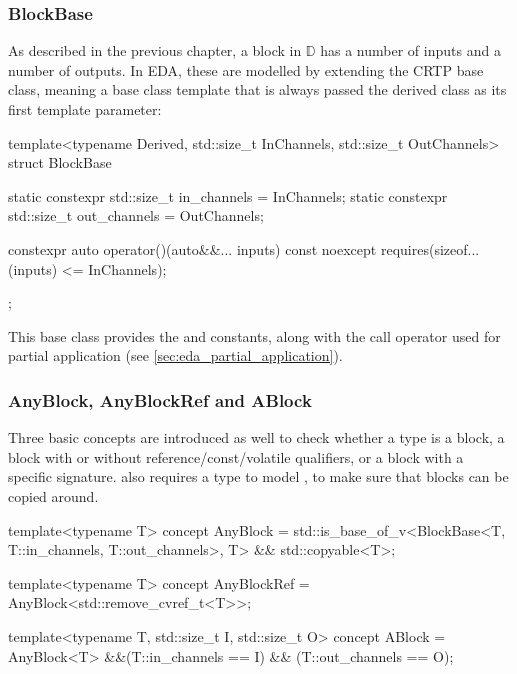 \subsubsection{BlockBase}

As described in the previous chapter, a block in $\mathbb D$ has a number of inputs and a number
of outputs. In EDA, these are modelled by extending the  CRTP\footnotemark{} base class, meaning a base
class template that is always passed the derived class as its first template parameter:


\begin{cppcodenl}
  template<typename Derived, std::size_t InChannels, std::size_t OutChannels>
  struct BlockBase {
    static constexpr std::size_t in_channels = InChannels;
    static constexpr std::size_t out_channels = OutChannels;

    constexpr auto operator()(auto&&... inputs) const noexcept
    requires(sizeof...(inputs) <= InChannels);
  };
\end{cppcodenl}

This base class provides the  and  constants, along with the call operator used
for partial application (see \autoref{sec:eda_partial_application}).

\subsubsection{AnyBlock, AnyBlockRef and ABlock}

Three basic concepts are introduced as well to check whether a type  is a block, a
block with or without reference/const/volatile qualifiers, or a block with a specific signature.
 also requires a type to model \footnotemark, to make sure that
blocks can be copied around.


\begin{cppcodenl}
  template<typename T>
  concept AnyBlock = std::is_base_of_v<BlockBase<T, T::in_channels, T::out_channels>, T> && std::copyable<T>;

  template<typename T>
  concept AnyBlockRef = AnyBlock<std::remove_cvref_t<T>>;

  template<typename T, std::size_t I, std::size_t O>
  concept ABlock = AnyBlock<T> &&(T::in_channels == I) && (T::out_channels == O);
\end{cppcodenl}

